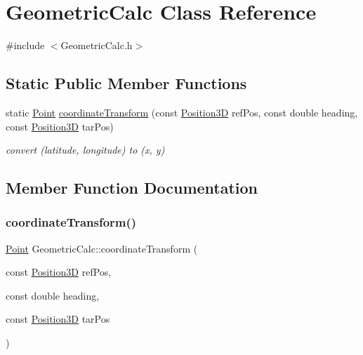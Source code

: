 \hypertarget{class_geometric_calc}{}\section{Geometric\+Calc Class Reference}
\label{class_geometric_calc}


{\ttfamily \#include $<$Geometric\+Calc.\+h$>$}

\subsection*{Static Public Member Functions}
\begin{DoxyCompactItemize}
\item 
static \hyperlink{_geometric_calc_8h_a7d6013bdb30e1e3c07a3d84518d395dc}{Point} \hyperlink{class_geometric_calc_ac31e5139933981c8244e8f5d15c7a7d0}{coordinate\+Transform} (const \hyperlink{_geometric_calc_8h_aabfa1dd0400b274a48b4a45afbee0af4}{Position3D} ref\+Pos, const double heading, const \hyperlink{_geometric_calc_8h_aabfa1dd0400b274a48b4a45afbee0af4}{Position3D} tar\+Pos)
\begin{DoxyCompactList}\small\item\em convert (latitude, longitude) to (x, y) \end{DoxyCompactList}\end{DoxyCompactItemize}


\subsection{Member Function Documentation}
\mbox{\label{class_geometric_calc_ac31e5139933981c8244e8f5d15c7a7d0}} 
\subsubsection{\texorpdfstring{coordinate\+Transform()}{coordinateTransform()}}
{\footnotesize\ttfamily \hyperlink{_geometric_calc_8h_a7d6013bdb30e1e3c07a3d84518d395dc}{Point} Geometric\+Calc\+::coordinate\+Transform (\begin{DoxyParamCaption}\item[{const \hyperlink{_geometric_calc_8h_aabfa1dd0400b274a48b4a45afbee0af4}{Position3D}}]{ref\+Pos,  }\item[{const double}]{heading,  }\item[{const \hyperlink{_geometric_calc_8h_aabfa1dd0400b274a48b4a45afbee0af4}{Position3D}}]{tar\+Pos }\end{DoxyParamCaption})\hspace{0.3cm}{\ttfamily [static]}}



